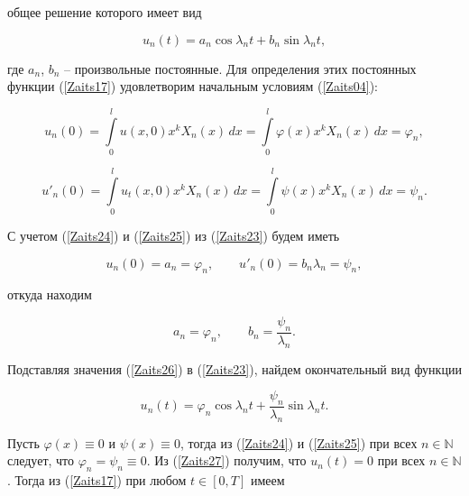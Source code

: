 общее решение которого имеет вид

\begin{equation}

\label{Zaits23}

u_n(t)=a_n\cos{\lambda_nt}+b_n\sin{\lambda_nt},

\end{equation}

где $a_n$, $b_n$ -- произвольные постоянные. Для определения этих постоянных функции (\ref{Zaits17}) удовлетворим начальным условиям (\ref{Zaits04}):

\begin{equation}

\label{Zaits24}

u_n(0)=\int\limits_0^l u(x,0)x^kX_n(x)\,dx=\int\limits_0^l \varphi(x)x^kX_n(x)\,dx=\varphi_n,

\end{equation}

\begin{equation}

\label{Zaits25}

u'_n(0)=\int\limits_0^l u_t(x,0)x^kX_n(x)\,dx=\int\limits_0^l \psi(x)x^kX_n(x)\,dx=\psi_n.

\end{equation}

С учетом (\ref{Zaits24}) и (\ref{Zaits25}) из (\ref{Zaits23}) будем иметь

$$u_n(0)=a_n=\varphi_n,\qquad u'_n(0)=b_n\lambda_n=\psi_n,$$

откуда находим

\begin{equation}

\label{Zaits26}

a_n=\varphi_n,\qquad b_n=\frac{\psi_n}{\lambda_n}.

\end{equation}

Подставляя значения (\ref{Zaits26}) в (\ref{Zaits23}), найдем окончательный вид функции

\begin{equation}

\label{Zaits27}

u_n(t)=\varphi_n\cos{\lambda_nt}+\frac{\psi_n}{\lambda_n}\sin{\lambda_nt}.

\end{equation}



Пусть $\varphi(x)\equiv0$ и $\psi(x)\equiv0$, тогда из (\ref{Zaits24}) и (\ref{Zaits25}) при всех $n\in \mathbb{N}$ следует, что $\varphi_n=\psi_n\equiv0$. Из (\ref{Zaits27}) получим, что $u_n(t)=0$ при всех $n\in \mathbb{N}$. Тогда из (\ref{Zaits17}) при любом $t\in[0,T]$ имеем

